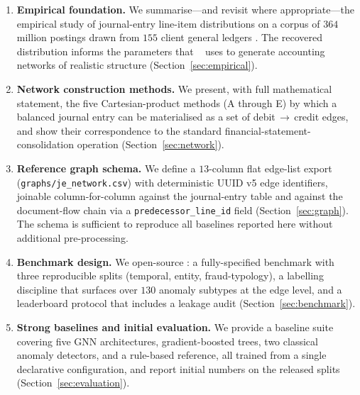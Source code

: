 \begin{enumerate}

  \item \textbf{Empirical foundation.}  We summarise---and revisit
    where appropriate---the empirical study of journal-entry
    line-item distributions on a corpus of $364$ million postings
    drawn from $155$ client general ledgers \citep{ivertowski2024apn}.
    The recovered distribution informs the parameters that
    \system{}~\citep{ivertowski2026datasynth} uses to generate
    accounting networks of realistic structure
    (Section~\ref{sec:empirical}).

  \item \textbf{Network construction methods.}  We present, with full
    mathematical statement, the five Cartesian-product methods
    (A through E) by which a balanced journal entry can be
    materialised as a set of debit\,$\to$\,credit edges, and show
    their correspondence to the standard
    financial-statement-consolidation operation
    (Section~\ref{sec:network}).

  \item \textbf{Reference graph schema.}  We define a $13$-column flat
    edge-list export (\texttt{graphs/je\_network.csv}) with
    deterministic UUID v5 edge identifiers, joinable column-for-column
    against the journal-entry table and against the document-flow
    chain via a \texttt{predecessor\_line\_id} field
    (Section~\ref{sec:graph}).  The schema is sufficient to reproduce
    all baselines reported here without additional pre-processing.

  \item \textbf{Benchmark design.}  We open-source \bench{}: a
    fully-specified benchmark with three reproducible splits
    (temporal, entity, fraud-typology), a labelling discipline that
    surfaces over $130$ anomaly subtypes at the edge level, and a
    leaderboard protocol that includes a leakage audit
    (Section~\ref{sec:benchmark}).

  \item \textbf{Strong baselines and initial evaluation.}  We provide
    a baseline suite covering five GNN architectures, gradient-boosted
    trees, two classical anomaly detectors, and a rule-based
    reference, all trained from a single declarative configuration,
    and report initial numbers on the released splits
    (Section~\ref{sec:evaluation}).

\end{enumerate}

